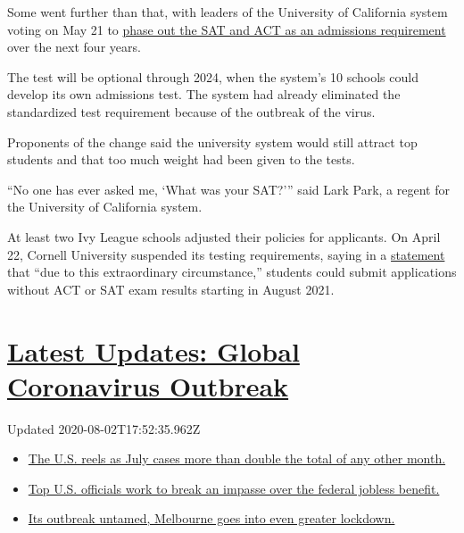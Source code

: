Some went further than that, with leaders of the University of
California system voting on May 21 to
\href{https://www.nytimes.com/2020/05/21/us/university-california-sat-act.html}{phase
out the SAT and ACT as an admissions requirement} over the next four
years.

The test will be optional through 2024, when the system's 10 schools
could develop its own admissions test. The system had already eliminated
the standardized test requirement because of the outbreak of the virus.

Proponents of the change said the university system would still attract
top students and that too much weight had been given to the tests.

``No one has ever asked me, `What was your SAT?''' said Lark Park, a
regent for the University of California system.

At least two Ivy League schools adjusted their policies for applicants.
On April 22, Cornell University suspended its testing requirements,
saying in a
\href{https://admissions.cornell.edu/news/cornell-university-suspends-actsat-testing-requirement-2021-applicants}{statement}
that ``due to this extraordinary circumstance,'' students could submit
applications without ACT or SAT exam results starting in August 2021.

\hypertarget{latest-updates-global-coronavirus-outbreak}{%
\section{\texorpdfstring{\href{https://www.nytimes.com/2020/08/01/world/coronavirus-covid-19.html?action=click\&pgtype=Article\&state=default\&region=MAIN_CONTENT_1\&context=storylines_live_updates}{Latest
Updates: Global Coronavirus
Outbreak}}{Latest Updates: Global Coronavirus Outbreak}}\label{latest-updates-global-coronavirus-outbreak}}

Updated 2020-08-02T17:52:35.962Z

\begin{itemize}
\tightlist
\item
  \href{https://www.nytimes.com/2020/08/01/world/coronavirus-covid-19.html?action=click\&pgtype=Article\&state=default\&region=MAIN_CONTENT_1\&context=storylines_live_updates\#link-34047410}{The
  U.S. reels as July cases more than double the total of any other
  month.}
\item
  \href{https://www.nytimes.com/2020/08/01/world/coronavirus-covid-19.html?action=click\&pgtype=Article\&state=default\&region=MAIN_CONTENT_1\&context=storylines_live_updates\#link-780ec966}{Top
  U.S. officials work to break an impasse over the federal jobless
  benefit.}
\item
  \href{https://www.nytimes.com/2020/08/01/world/coronavirus-covid-19.html?action=click\&pgtype=Article\&state=default\&region=MAIN_CONTENT_1\&context=storylines_live_updates\#link-2bc8948}{Its
  outbreak untamed, Melbourne goes into even greater lockdown.}
\end{itemize}

